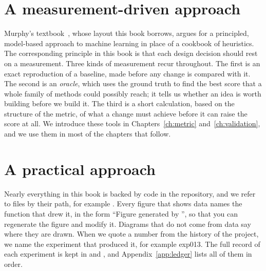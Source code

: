 \documentclass[11pt,oneside]{book}
\begin{document}
\section*{A measurement-driven approach}
Murphy's textbook~\citep{murphy}, whose layout this book borrows, argues for a principled, model-based approach
to machine learning in place of a cookbook of heuristics. The corresponding principle in this
book is that each design decision should rest on a measurement. Three kinds of measurement recur
throughout. The first is an exact reproduction of a baseline, made before any change is compared
with it. The second is an \emph{oracle}, which uses the ground truth to find the best score that
a whole family of methods could possibly reach; it tells us whether an idea is worth building
before we build it. The third is a short calculation, based on the structure of the metric, of
what a change must achieve before it can raise the score at all. We introduce these tools in
Chapters~\ref{ch:metric} and~\ref{ch:validation}, and we use them in most of the chapters that
follow.

\section*{A practical approach}
Nearly everything in this book is backed by code in the repository, and we refer to files by
their path, for example . Every figure that shows data names the function
that drew it, in the form ``Figure generated by '',
so that you can regenerate the figure and modify it. Diagrams that do not come from data say
where they are drawn. When we quote a number from the history of the project, we name the
experiment that produced it, for example exp013. The full record of each experiment is kept in
 and , and
Appendix~\ref{app:ledger} lists all of them in order.
\end{document}
